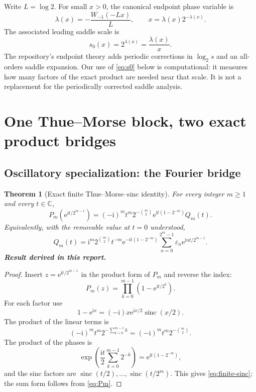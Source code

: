 \documentclass[11pt,oneside]{article}
\numberwithin{equation}{section}
\newtheorem{theorem}{Theorem}[section]
\theoremstyle{definition}
\theoremstyle{remark}
\newcommand{\C}{\mathbb C}
\newcommand{\sinc}{\operatorname{sinc}}
\newcommand{\e}{\mathrm e}
\newcommand{\ii}{\mathrm i}
\newcommand{\eps}{\varepsilon}
\newcommand{\newresult}{\textbf{Result derived in this report.}}
\begin{document}
Write $L=\log2$.  For small $x>0$, the canonical endpoint phase variable is
\begin{equation}
 \lambda(x)=-\frac{W_{-1}(-Lx)}{L},
 \qquad x=\lambda(x)2^{-\lambda(x)}.
 \label{eq:lambda}
\end{equation}
The associated leading saddle scale is
\begin{equation}
 s_0(x)=2^{\lambda(x)}=\frac{\lambda(x)}{x}.
 \label{eq:s0}
\end{equation}
The repository's endpoint theory adds periodic corrections in $\log_2s$ and an all-orders
saddle expansion.  Our use of \eqref{eq:s0} below is computational: it measures how many
factors of the exact product are needed near that scale.  It is not a replacement for the
periodically corrected saddle analysis.

\section{One Thue--Morse block, two exact product bridges}
\label{sec:bridges}

\subsection{Oscillatory specialization: the Fourier bridge}

\begin{theorem}[Exact finite Thue--Morse--sinc identity]
\label{thm:finite-sinc}
For every integer $m\ge1$ and every $t\in\C$,
\begin{equation}
 \boxed{
 P_m\!\left(\e^{\ii t/2^{m-1}}\right)
 =(-\ii)^m t^m 2^{-\binom m2}
   \e^{\ii t(1-2^{-m})}Q_m(t).}
 \label{eq:finite-sinc}
\end{equation}
Equivalently, with the removable value at $t=0$ understood,
\begin{equation}
 \boxed{
 Q_m(t)=\ii^m2^{\binom m2}t^{-m}
 \e^{-\ii t(1-2^{-m})}
 \sum_{n=0}^{2^m-1}\eps_n\e^{\ii nt/2^{m-1}}.}
 \label{eq:normalized-TM-Fourier}
\end{equation}
\newresult
\end{theorem}

\begin{proof}
Insert $z=\e^{\ii t/2^{m-1}}$ in the product form of $P_m$ and reverse the
index:
\[
 P_m(z)=\prod_{k=0}^{m-1}\left(1-\e^{\ii t/2^k}\right).
\]
For each factor use
\[
 1-\e^{\ii x}=(-\ii)x\e^{\ii x/2}\sinc(x/2).
\]
The product of the linear terms is
\[
 (-\ii)^m t^m2^{-\sum_{k=0}^{m-1}k}
 =(-\ii)^m t^m2^{-\binom m2}.
\]
The product of the phases is
\[
 \exp\!\left(\frac{\ii t}{2}\sum_{k=0}^{m-1}2^{-k}\right)
 =\e^{\ii t(1-2^{-m})},
\]
and the sinc factors are $\sinc(t/2),\ldots,\sinc(t/2^m)$.  This gives
\eqref{eq:finite-sinc}; the sum form follows from \eqref{eq:Pm}.
\end{proof}
\end{document}
